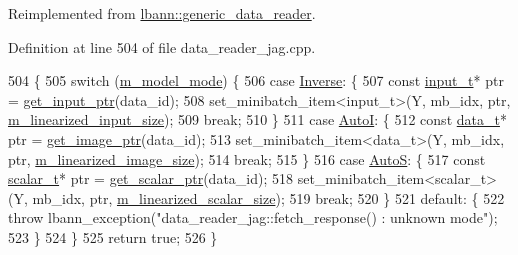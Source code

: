 Reimplemented from \hyperlink{classlbann_1_1generic__data__reader_abe544ea807eed477f3636010d199b574}{lbann\+::generic\+\_\+data\+\_\+reader}.



Definition at line 504 of file data\+\_\+reader\+\_\+jag.\+cpp.


\begin{DoxyCode}
504                                                                              \{
505   \textcolor{keywordflow}{switch} (\hyperlink{classlbann_1_1data__reader__jag_a877eb1f0eb2afccd73cd7d69407ff6e2}{m\_model\_mode}) \{
506     \textcolor{keywordflow}{case} \hyperlink{classlbann_1_1data__reader__jag_a114c369c8604df385cf7a3ec20c9739ba2d3bba9f202270762169c1c01d2fb7a4}{Inverse}: \{
507       \textcolor{keyword}{const} \hyperlink{classlbann_1_1data__reader__jag_ab08c9af4bca496b7889de1473c3d8d4e}{input\_t}* ptr = \hyperlink{classlbann_1_1data__reader__jag_a5535a2dc025d484ac01a6aad8585c9b5}{get\_input\_ptr}(data\_id);
508       set\_minibatch\_item<input\_t>(Y, mb\_idx, ptr, \hyperlink{classlbann_1_1data__reader__jag_a75e3c8870f9fc8e50fb24e4515ac7d82}{m\_linearized\_input\_size});
509       \textcolor{keywordflow}{break};
510     \}
511     \textcolor{keywordflow}{case} \hyperlink{classlbann_1_1data__reader__jag_a114c369c8604df385cf7a3ec20c9739bae9c49fc4443020e18086fc83ce0b369b}{AutoI}: \{
512       \textcolor{keyword}{const} \hyperlink{classlbann_1_1data__reader__jag_a7377d6c02c455f019a378489b9b8eab4}{data\_t}* ptr = \hyperlink{classlbann_1_1data__reader__jag_aab51581a1b8175bf5da1b74454ef7701}{get\_image\_ptr}(data\_id);
513       set\_minibatch\_item<data\_t>(Y, mb\_idx, ptr, \hyperlink{classlbann_1_1data__reader__jag_a7c2aa5f489e7c7a3236c1f6c4a760048}{m\_linearized\_image\_size});
514       \textcolor{keywordflow}{break};
515     \}
516     \textcolor{keywordflow}{case} \hyperlink{classlbann_1_1data__reader__jag_a114c369c8604df385cf7a3ec20c9739baab2b8e8bef02dfc8ffaae80bdd0a7fd4}{AutoS}: \{
517       \textcolor{keyword}{const} \hyperlink{classlbann_1_1data__reader__jag_aa2e01bc071588b9c1a583e5a752abcc6}{scalar\_t}* ptr = \hyperlink{classlbann_1_1data__reader__jag_abaa3c00c30ebaa54d395c93f0225570c}{get\_scalar\_ptr}(data\_id);
518       set\_minibatch\_item<scalar\_t>(Y, mb\_idx, ptr, \hyperlink{classlbann_1_1data__reader__jag_a856b4b9cdf9d8569e5fef1d5d996870d}{m\_linearized\_scalar\_size});
519       \textcolor{keywordflow}{break};
520     \}
521     \textcolor{keywordflow}{default}: \{
522       \textcolor{keywordflow}{throw} lbann\_exception(\textcolor{stringliteral}{"data\_reader\_jag::fetch\_response() : unknown mode"});
523     \}
524   \}
525   \textcolor{keywordflow}{return} \textcolor{keyword}{true};
526 \}
\end{DoxyCode}
